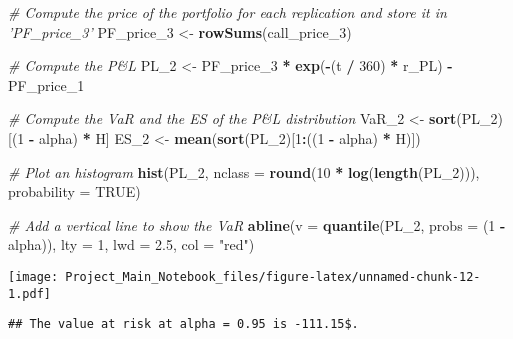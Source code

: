 \documentclass[]{article}
\newenvironment{Shaded}{\begin{snugshade}}{\end{snugshade}}
\newcommand{\CommentTok}[1]{\textcolor[rgb]{0.56,0.35,0.01}{\textit{#1}}}
\newcommand{\DataTypeTok}[1]{\textcolor[rgb]{0.13,0.29,0.53}{#1}}
\newcommand{\DecValTok}[1]{\textcolor[rgb]{0.00,0.00,0.81}{#1}}
\newcommand{\FloatTok}[1]{\textcolor[rgb]{0.00,0.00,0.81}{#1}}
\newcommand{\KeywordTok}[1]{\textcolor[rgb]{0.13,0.29,0.53}{\textbf{#1}}}
\newcommand{\NormalTok}[1]{#1}
\newcommand{\OperatorTok}[1]{\textcolor[rgb]{0.81,0.36,0.00}{\textbf{#1}}}
\newcommand{\OtherTok}[1]{\textcolor[rgb]{0.56,0.35,0.01}{#1}}
\newcommand{\StringTok}[1]{\textcolor[rgb]{0.31,0.60,0.02}{#1}}
\begin{document}
\begin{Shaded}
\begin{Highlighting}[]
\CommentTok{# Compute the price of the portfolio for each replication and store it in 'PF_price_3'}
\NormalTok{PF_price_}\DecValTok{3}\NormalTok{ <-}\StringTok{ }\KeywordTok{rowSums}\NormalTok{(call_price_}\DecValTok{3}\NormalTok{)}

\CommentTok{# Compute the P&L}
\NormalTok{PL_}\DecValTok{2}\NormalTok{ <-}\StringTok{ }\NormalTok{PF_price_}\DecValTok{3} \OperatorTok{*}\StringTok{ }\KeywordTok{exp}\NormalTok{(}\OperatorTok{-}\NormalTok{(t }\OperatorTok{/}\StringTok{ }\DecValTok{360}\NormalTok{) }\OperatorTok{*}\StringTok{ }\NormalTok{r_PL) }\OperatorTok{-}\StringTok{ }\NormalTok{PF_price_}\DecValTok{1}

\CommentTok{# Compute the VaR and the ES of the P&L distribution}
\NormalTok{VaR_}\DecValTok{2}\NormalTok{ <-}\StringTok{ }\KeywordTok{sort}\NormalTok{(PL_}\DecValTok{2}\NormalTok{)[(}\DecValTok{1} \OperatorTok{-}\StringTok{ }\NormalTok{alpha) }\OperatorTok{*}\StringTok{ }\NormalTok{H]}
\NormalTok{ES_}\DecValTok{2}\NormalTok{  <-}\StringTok{ }\KeywordTok{mean}\NormalTok{(}\KeywordTok{sort}\NormalTok{(PL_}\DecValTok{2}\NormalTok{)[}\DecValTok{1}\OperatorTok{:}\NormalTok{((}\DecValTok{1} \OperatorTok{-}\StringTok{ }\NormalTok{alpha) }\OperatorTok{*}\StringTok{ }\NormalTok{H)])}

\CommentTok{# Plot an histogram}
\KeywordTok{hist}\NormalTok{(PL_}\DecValTok{2}\NormalTok{, }\DataTypeTok{nclass =} \KeywordTok{round}\NormalTok{(}\DecValTok{10} \OperatorTok{*}\StringTok{ }\KeywordTok{log}\NormalTok{(}\KeywordTok{length}\NormalTok{(PL_}\DecValTok{2}\NormalTok{))), }\DataTypeTok{probability =} \OtherTok{TRUE}\NormalTok{)}

\CommentTok{# Add a vertical line to show the VaR}
\KeywordTok{abline}\NormalTok{(}\DataTypeTok{v   =} \KeywordTok{quantile}\NormalTok{(PL_}\DecValTok{2}\NormalTok{, }\DataTypeTok{probs =}\NormalTok{ (}\DecValTok{1} \OperatorTok{-}\StringTok{ }\NormalTok{alpha)),}
       \DataTypeTok{lty =} \DecValTok{1}\NormalTok{,}
       \DataTypeTok{lwd =} \FloatTok{2.5}\NormalTok{,}
       \DataTypeTok{col =} \StringTok{"red"}\NormalTok{)}
\end{Highlighting}
\end{Shaded}

\texttt{[image: Project\_Main\_Notebook\_files/figure-latex/unnamed-chunk-12-1.pdf]}

\begin{verbatim}
## The value at risk at alpha = 0.95 is -111.15$.
\end{verbatim}
\end{document}

